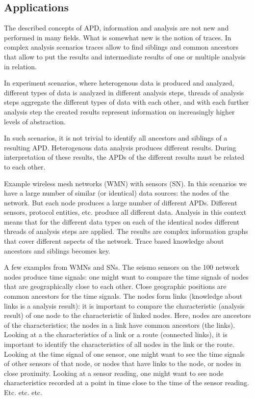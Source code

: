 \subsection{Applications}

The described concepts of APD, information and analysis are not new and performed in many fields. What is somewhat new is the notion of traces. In complex analysis scenarios traces allow to find siblings and common ancestors that allow to put the results and intermediate results of one or multiple analysis in relation. 

In experiment scenarios, where heterogenous data is produced and analyzed, different types of data is analyzed in different analysis steps, threads of analysis steps aggregate the different types of data with each other, and with each further analysis step the created results represent information on increasingly higher levels of abstraction.

In such scenarios, it is not trivial to identify all ancestors and siblings of a resulting APD. Heterogenous data analysis produces different results. During interpretation of these results, the APDs of the different results must be related to each other. 

Example wireless mesh networks (WMN) with sensors (SN). In this scenarios we have a large number of similar (or identical) data sources: the nodes of the network. But each node produces a large number of different APDs. Different sensors, protocol entities, etc. produce all different data. Analysis in this context means that for the different data types on each of the identical nodes different threads of analysis steps are applied. The results are complex information graphs that cover different aspects of the network. Trace based knowledge about ancestors and siblings becomes key. 

A few examples from WMNs and SNs. The seismo sensors on the 100 network nodes produce time signals: one might want to compare the time signals of nodes that are geographically close to each other. Close geographic positions are common ancestors for the time signals. The nodes form links (knowledge about links is a analysis result): it is important to compare the characteristic (analysis result) of one node to the characteristic of linked nodes. Here, nodes are ancestors of the characteristics; the nodes in a link have common ancestors (the links). Looking at a the characteristics of a link or a route (connected links), it is important to identify the characteristics of all nodes in the link or the route. Looking at the time signal of one sensor, one might want to see the time signals of other sensors of that node, or nodes that have links to the node, or nodes in close proximity. Looking at a sensor reading, one might want to see node characteristics recorded at a point in time close to the time of the sensor reading. Etc. etc. etc.


